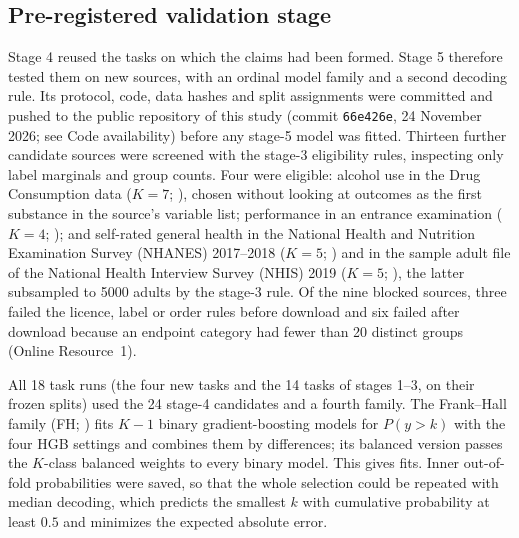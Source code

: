 \documentclass[pdflatex,sn-mathphys-ay]{sn-jnl}
\theoremstyle{thmstyleone}
\theoremstyle{thmstylethree}
\begin{document}
\subsection{Pre-registered validation stage}\label{sec:stage5}

Stage 4 reused the tasks on which the claims had been formed. Stage 5 therefore tested them on new sources, with an ordinal model family and a second decoding rule. Its protocol, code, data hashes and split assignments were committed and pushed to the public repository of this study (commit \texttt{66e426e}, 24 November 2026; see Code availability) before any stage-5 model was fitted. Thirteen further candidate sources were screened with the stage-3 eligibility rules, inspecting only label marginals and group counts. Four were eligible: alcohol use in the Drug Consumption data ($K=7$; \citealp{Fehrman2017,UCIDrug}), chosen without looking at outcomes as the first substance in the source's variable list; performance in an entrance examination ($K=4$; \citealp{UCIEntrance}); and self-rated general health in the National Health and Nutrition Examination Survey (NHANES) 2017--2018 ($K=5$; \citealp{NHANES2017}) and in the sample adult file of the National Health Interview Survey (NHIS) 2019 ($K=5$; \citealp{NHIS2019}), the latter subsampled to 5000 adults by the stage-3 rule. Of the nine blocked sources, three failed the licence, label or order rules before download and six failed after download because an endpoint category had fewer than 20 distinct groups (Online Resource~1).

All 18 task runs (the four new tasks and the 14 tasks of stages 1--3, on their frozen splits) used the 24 stage-4 candidates and a fourth family. The Frank--Hall family (FH; \citealp{Frank2001}) fits $K-1$ binary gradient-boosting models for $P(y>k)$ with the four HGB settings and combines them by differences; its balanced version passes the $K$-class balanced weights to every binary model. This gives \FitsStageFive{} fits. Inner out-of-fold probabilities were saved, so that the whole selection could be repeated with median decoding, which predicts the smallest $k$ with cumulative probability at least $0.5$ and minimizes the expected absolute error.
\end{document}
